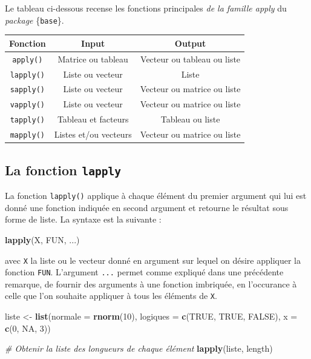 \documentclass[
  11pt,
]{book}
\newenvironment{Shaded}{\begin{snugshade}}{\end{snugshade}}
\newcommand{\CommentTok}[1]{\textcolor[rgb]{0.56,0.35,0.01}{\textit{#1}}}
\newcommand{\DataTypeTok}[1]{\textcolor[rgb]{0.13,0.29,0.53}{#1}}
\newcommand{\DecValTok}[1]{\textcolor[rgb]{0.00,0.00,0.81}{#1}}
\newcommand{\KeywordTok}[1]{\textcolor[rgb]{0.13,0.29,0.53}{\textbf{#1}}}
\newcommand{\NormalTok}[1]{#1}
\newcommand{\OtherTok}[1]{\textcolor[rgb]{0.56,0.35,0.01}{#1}}
\newcommand{\StringTok}[1]{\textcolor[rgb]{0.31,0.60,0.02}{#1}}
\numberwithin{equation}{section}
\numberwithin{countremarque}{section}
\begin{document}
Le tableau ci-dessous recense les fonctions principales \emph{de la famille apply} du \emph{package} \{\texttt{base}\}.

\begin{longtable}[]{@{}ccc@{}}
\toprule
Fonction & Input & Output\tabularnewline
\midrule
\endhead
\texttt{apply()} & Matrice ou tableau & Vecteur ou tableau ou liste\tabularnewline
\texttt{lapply()} & Liste ou vecteur & Liste\tabularnewline
\texttt{sapply()} & Liste ou vecteur & Vecteur ou matrice ou liste\tabularnewline
\texttt{vapply()} & Liste ou vecteur & Vecteur ou matrice ou liste\tabularnewline
\texttt{tapply()} & Tableau et facteurs & Tableau ou liste\tabularnewline
\texttt{mapply()} & Listes et/ou vecteurs & Vecteur ou matrice ou liste\tabularnewline
\bottomrule
\end{longtable}

\hypertarget{boucles_vectorisation_apply_lapply}{%
\subsection{\texorpdfstring{La fonction \texttt{lapply}}{La fonction lapply}}\label{boucles_vectorisation_apply_lapply}}

La fonction \texttt{lapply()} applique à chaque élément du premier argument qui lui est donné une fonction indiquée en second argument et retourne le résultat sous forme de liste. La syntaxe est la suivante :

\begin{Shaded}
\begin{Highlighting}[]
\KeywordTok{lapply}\NormalTok{(X, FUN, ...)}
\end{Highlighting}
\end{Shaded}

avec \texttt{X} la liste ou le vecteur donné en argument sur lequel on désire appliquer la fonction \texttt{FUN}. L'argument \texttt{...} permet comme expliqué dans une précédente remarque, de fournir des arguments à une fonction imbriquée, en l'occurance à celle que l'on souhaite appliquer à tous les éléments de \texttt{X}.

\begin{Shaded}
\begin{Highlighting}[]
\NormalTok{liste \textless{}{-}}\StringTok{ }
\StringTok{  }\KeywordTok{list}\NormalTok{(}\DataTypeTok{normale =} \KeywordTok{rnorm}\NormalTok{(}\DecValTok{10}\NormalTok{),}
       \DataTypeTok{logiques =} \KeywordTok{c}\NormalTok{(}\OtherTok{TRUE}\NormalTok{,  }\OtherTok{TRUE}\NormalTok{, }\OtherTok{FALSE}\NormalTok{),}
       \DataTypeTok{x =} \KeywordTok{c}\NormalTok{(}\DecValTok{0}\NormalTok{, }\OtherTok{NA}\NormalTok{, }\DecValTok{3}\NormalTok{))}

\CommentTok{\# Obtenir la liste des longueurs de chaque élément}
\KeywordTok{lapply}\NormalTok{(liste, length)}
\end{Highlighting}
\end{Shaded}
\end{document}
